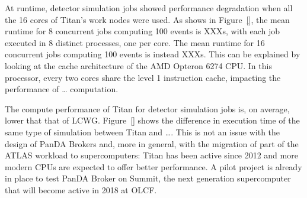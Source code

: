 

At runtime, detector simulation jobs showed performance degradation when all the
16 cores of Titan's work nodes were used. As shows in
Figure~\ref{}, the mean runtime for 8 concurrent jobs computing 100 events is XXXs,
with each job executed in 8 distinct processes, one per core. The mean runtime
for 16 concurrent jobs computing 100 events is instead XXXs. This can be
explained by looking at the cache architecture of the AMD Opteron 6274 CPU. In
this processor, every two cores share the level 1 instruction cache, impacting
the performance of \ldots{}
computation.

The compute performance of Titan for detector simulation jobs is, on average,
lower that that of LCWG. Figure~\ref{} shows the difference in
execution time of the same type of simulation between Titan and
\ldots{}. This is not an issue with
the design of PanDA Brokers and, more in general, with the migration of part of
the ATLAS workload to supercomputers: Titan has been active since 2012 and more
modern CPUs are expected to offer better performance. A pilot project is already
in place to test PanDA Broker on Summit, the next generation supercomputer that
will become active in 2018 at OLCF.

